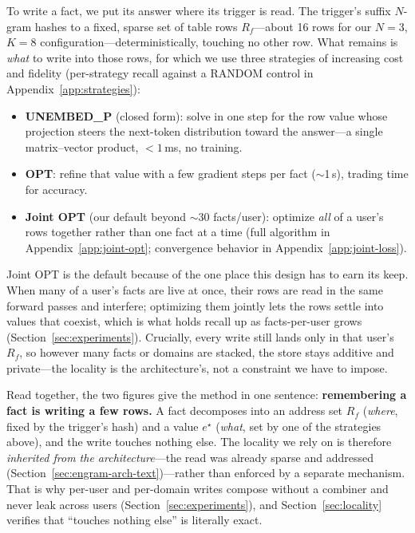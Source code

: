 \documentclass[11pt]{article}
\begin{document}
To write a fact, we put its answer where its trigger is read. The
trigger's suffix $N$-gram hashes to a fixed, sparse set of table
rows $R_f$---about 16 rows for our $N{=}3$, $K{=}8$
configuration---deterministically, touching no other row. What
remains is \emph{what} to write into those rows, for which we use
three strategies of increasing cost and fidelity (per-strategy
recall against a RANDOM control in Appendix~\ref{app:strategies}):
\begin{itemize}[leftmargin=*,topsep=1pt,itemsep=1pt]
  \item \textbf{UNEMBED\_P} (closed form): solve in one step for
        the row value whose projection steers the next-token
        distribution toward the answer---a single matrix--vector
        product, ${<}1$\,ms, no training.
  \item \textbf{OPT}: refine that value with a few gradient steps
        per fact ($\sim$1\,s), trading time for accuracy.
  \item \textbf{Joint OPT} (our default beyond $\sim$30
        facts/user): optimize \emph{all} of a user's rows
        together rather than one fact at a time (full algorithm
        in Appendix~\ref{app:joint-opt}; convergence behavior in
        Appendix~\ref{app:joint-loss}).
\end{itemize}
Joint OPT is the default because of the one place this design has
to earn its keep. When many of a user's facts are live at once,
their rows are read in the same forward passes and interfere;
optimizing them jointly lets the rows settle into values that
coexist, which is what holds recall up as facts-per-user grows
(Section~\ref{sec:experiments}). Crucially, every write still
lands only in that user's $R_f$, so however many facts or domains
are stacked, the store stays additive and private---the locality
is the architecture's, not a constraint we have to impose.

Read together, the two figures give the method in one sentence:
\textbf{remembering a fact is writing a few rows.} A fact
decomposes into an address set $R_f$ (\emph{where}, fixed by the
trigger's hash) and a value $e^\star$ (\emph{what}, set by one of
the strategies above), and the write touches nothing else. The
locality we rely on is therefore \emph{inherited from the
architecture}---the read was already sparse and addressed
(Section~\ref{sec:engram-arch-text})---rather than enforced by a
separate mechanism. That is why per-user and per-domain writes
compose without a combiner and never leak across users
(Section~\ref{sec:experiments}), and Section~\ref{sec:locality}
verifies that ``touches nothing else'' is literally exact.
\end{document}
